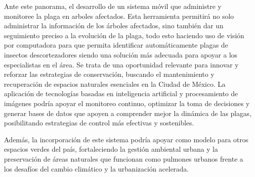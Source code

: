 Ante este panorama, el desarrollo de un sistema móvil que administre y monitoree la plaga en arboles afectados. Esta
herramienta permitirá no solo administrar la información de los árboles afectados, sino también dar un seguimiento
preciso a la evolución de la plaga, todo esto haciendo uso de visión por computadora para que permita identificar
automáticamente plagas de insectos descortezadores siendo una solución más adecuada para apoyar a los especialistas
en el área. Se trata de una oportunidad relevante para innovar y reforzar las estrategias de conservación, buscando el
mantenimiento y recuperación de espacios naturales esenciales en la Ciudad de México. La aplicación de tecnologías
basadas en inteligencia artificial y procesamiento de imágenes podría apoyar el monitoreo continuo, optimizar la toma
de decisiones y generar bases de datos que apoyen a comprender mejor la dinámica de las plagas, posibilitando
estrategias de control más efectivas y sostenibles.



Además, la incorporación de este sistema podría apoyar como modelo para otros espacios verdes del país,
fortaleciendo la gestión ambiental urbana y la preservación de áreas naturales que funcionan como pulmones urbanos
frente a los desafíos del cambio climático y la urbanización acelerada.



